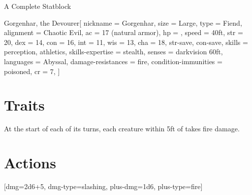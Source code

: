 \begin{ExampleBlock}{A Complete Statblock}
\begin{RpgStat}{Gorgenhar, the Devourer}[
    nickname = Gorgenhar,
    size = Large, type = Fiend, alignment = Chaotic Evil,
    ac = 17 (natural armor), hp = , speed = 40ft,
    str = 20, dex = 14, con = 16, int = 11, wis = 13, cha = 18,
    str-save, con-save,
    skills = {perception, athletics}, skills-expertise = {stealth},
    senses = darkvision 60ft, languages = Abyssal,
    damage-resistances = fire, condition-immunities = poisoned,
    cr = 7,
]
    \section{Traits}
         At the start of each of its turns, each creature within 5ft of \name{} takes  fire damage.
    \section{Actions}
        [dmg=2d6+5, dmg-type=slashing, plus-dmg=1d6, plus-type=fire]
\end{RpgStat}


\end{ExampleBlock}
